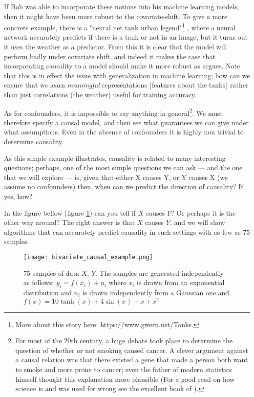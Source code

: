 If Bob was able to incorporate these notions into his machine learning models, then it might have been more
robust to the covariate-shift. To give a more concrete example, there is a "neural net tank urban legend"\footnote{
    More about this story here: https://www.gwern.net/Tanks.
}
, where a neural network accurately predicts if there is a tank or not in an image, but it turns out it uses the 
weather as a predictor. From this it is clear that the model will perform badly under covariate shift, and indeed
it makes the case that incorporating causality to a model should make it more robust as
\cite{scholkopf2019causality} argues. Note that this is in effect the issue with generalization in machine learning:
how can we ensure that we learn \textit{meaningful} representations (features about the tanks) rather than just
correlations (the weather) useful for training accuracy. 

As for confounders, it is impossible to say anything in general\footnote{
    For most of the 20th century, a huge debate took place to determine the question of whether or not 
    smoking caused cancer. A clever argument against a causal relation was that there existed a gene that 
    made a person both want to smoke and more prone to cancer; even the father of modern statistics
    himself thought this explanation more plausible (For a good read on how science is and was used 
    for wrong see the excellent book of \cite{NaomiMerchants}).
    
}. We must therefore specify a causal model, and
then see what guarantees we can give under what assumptions. Even in the absence of confounders it is highly 
non trivial to determine causality.

As this simple example illustrates, causality is related to many interesting questions; perhaps, one of the most 
simple questions we can ask --- and the one that we will explore --- is, given that either X causes Y, or Y causes X
(we assume no confounders) then, when 
can we predict the direction of causality? If yes, how? 

In the figure bellow (figure \ref{fig:simple_bivariate_example}) can you tell if $X$ causes $Y$? Or perhaps
it is the other way around? The right answer is that $X$ causes $Y$, and we will show algorithms that 
can accurately predict causality in such settings with as few as 75 samples. 

\begin{figure}[H]
    \centering
    \texttt{[image: bivariate\_causal\_example.png]}
    \caption{75 samples of data $X$, $Y$.  The samples are generated independently as follows:
    $y_i = f(x_i) + n_i$ where $x_i$ is drawn from an exponential distribution and $n_i$ is drawn 
    independently from a Gaussian one and $f(x) = 10 \tanh(x) + 4\sin(x) + x + x^2$}
    \label{fig:simple_bivariate_example}
\end{figure}

